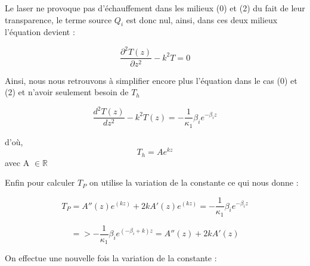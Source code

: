 \documentclass{rapportECC}
\begin{document}
Le laser ne provoque pas d'échauffement dans les milieux (0) et (2) du fait de leur transparence, le terme source $Q_i$ est donc nul, ainsi, dans ces deux milieux l'équation devient :

\begin{equation}
    \frac{\partial^2 T(z)}{\partial z^2} - k^2 T = 0
\end{equation}

Ainsi, nous nous retrouvons à simplifier encore plus l'équation dans le cas (0) et (2) et n'avoir seulement besoin de $T_h$

\begin{equation*}
    \frac{d^2 T(z)}{d z^2} - k^2 T(z) = - \frac{1}{\kappa_1}\beta_i e^{-\beta_iz}
\end{equation*}

d'où,
\begin{equation}
    T_h = A e^{kz} 
\end{equation}
avec A $\in \mathbb{R}$

Enfin pour calculer $T_P$ on utilise la variation de la constante ce qui nous donne :

\begin{equation*}
            T_P = A''(z)e^{(kz)} + 2k A'(z)e^{(kz)} = - \frac{1}{\kappa_1}\beta_i e^{-\beta_iz} 
\end{equation*}

\begin{equation*}
            => - \frac{1}{\kappa_1}\beta_i e^{(-\beta_i + k)z} = A''(z) + 2k A'(z)
\end{equation*}

On effectue une nouvelle fois la variation de la constante :
\end{document}
